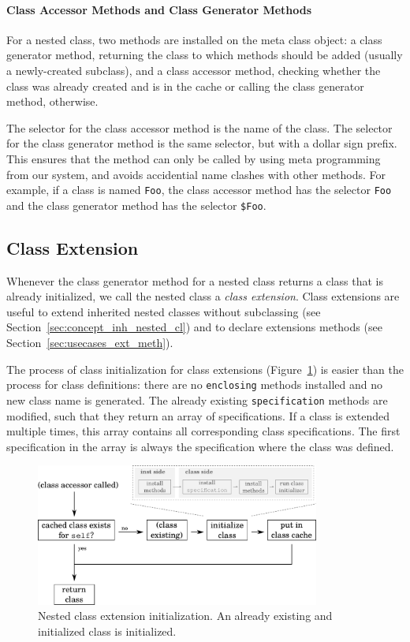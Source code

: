 \paragraph{Class Accessor Methods and Class Generator Methods}
For a nested class, two methods are installed on the meta class object: a class generator method, returning the class to which methods should be added (usually a newly-created subclass), and a class accessor method, checking whether the class was already created and is in the cache or calling the class generator method, otherwise.

The selector for the class accessor method is the name of the class. The selector for the class generator method is the same selector, but with a dollar sign prefix. This ensures that the method can only be called by using meta programming from our system, and avoids accidential name clashes with other methods. For example, if a class is named \texttt{Foo}, the class accessor method has the selector \texttt{Foo} and the class generator method has the selector \texttt{\$Foo}.

\subsection{Class Extension}
\label{sec:impl_class_ext_subsec}
Whenever the class generator method for a nested class returns a class that is already initialized, we call the nested class a \emph{class extension}. Class extensions are useful to extend inherited nested classes without subclassing (see Section~\ref{sec:concept_inh_nested_cl}) and to declare extensions methods (see Section~\ref{sec:usecases_ext_meth}). 

The process of class initialization for class extensions (Figure~\ref{fig:lazy_class_gen_ext}) is easier than the process for class definitions: there are no \texttt{enclosing} methods installed and no new class name is generated. The already existing \texttt{specification} methods are modified, such that they return an array of specifications. If a class is extended multiple times, this array contains all corresponding class specifications. The first specification in the array is always the specification where the class was defined.

\begin{figure}[!htp]
	\includegraphics[width=0.8314\textwidth]{lazy_class_gen_ext.pdf}
	\centering
	\caption[Nested class extension initialization]{Nested class extension initialization. An already existing and initialized class is initialized.}
	\label{fig:lazy_class_gen_ext}
\end{figure}

